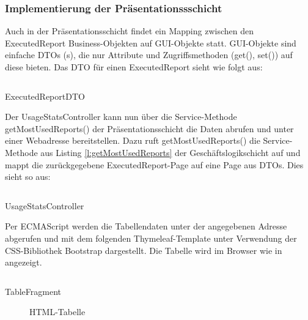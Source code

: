 \subsubsection{Implementierung der Präsentationssschicht}
\label{sec:ImplementierungPraesentationsschicht}
Auch in der Präsentationsschicht findet ein Mapping zwischen den ExecutedReport Business-Objekten auf \ac{GUI}-Objekte statt. \ac{GUI}-Objekte sind einfache \acs{DTO}s (s), die nur Attribute und Zugriffsmethoden (get(), set()) auf diese bieten. Das \ac{DTO} für einen ExecutedReport sieht wie folgt aus:
\begin{listing}[!ht]
  \inputminted{java}{Listings/ExecutedReportDTO.java}
  \caption{ExecutedReportDTO}
  \label{l:ExecutedReportDTO}
\end{listing}
Der UsageStatsController kann nun über die Service-Methode getMostUsedReports() der Präsentationsschicht die Daten abrufen und unter einer Webadresse bereitstellen. Dazu ruft getMostUsedReports() die Service-Methode aus Listing \ref{l:getMostUsedReports} der Geschäftslogikschicht auf und mappt die zurückgegebene ExecutedReport-Page auf eine Page aus \ac{DTO}s. Dies sieht so aus:
\begin{listing}[!ht]
  \inputminted{java}{Listings/UsageStatsController.java}
  \caption{UsageStatsController}
  \label{l:UsageStatsController}
\end{listing}
Per ECMAScript werden die Tabellendaten unter der angegebenen Adresse abgerufen und \ua mit dem folgenden Thymeleaf-Template unter Verwendung der CSS-Bibliothek Bootstrap dargestellt. Die Tabelle wird im Browser wie in  angezeigt.
\begin{listing}[!ht]
  \inputminted{java}{Listings/TableFragment.html}
  \caption{TableFragment}
  \label{l:TableFragment}
\end{listing}
\clearpage
\begin{figure}[htb]
	\centering
	\caption{HTML-Tabelle}
	\label{fig:Tabelle}
\end{figure}

